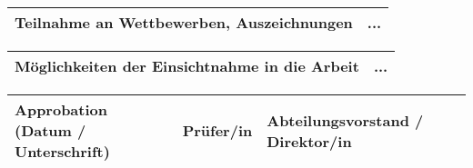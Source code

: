 \vspace{0.5cm}

\begin{tabular}{|p{53mm}|p{110mm}|}
\hline
\vspace{0.05cm}
Teilnahme an \newline Wettbewerben, \newline Auszeichnungen &
\vspace{0.05cm}
...\\ [1.1cm]
\hline
\end{tabular}

\vspace{0.5cm}

\begin{tabular}{|p{53mm}|p{110mm}|}
\hline
\vspace{0.05cm}
M\"oglichkeiten der \newline Einsichtnahme in die \newline Arbeit &
\vspace{0.05cm}
...\\ [0.8cm]
\hline
\end{tabular}

\vspace{0.5cm}

\begin{tabular}{|p{5.3cm}|p{5.28cm}|p{5.29cm}|@{}m{0cm}@{}}
\hline
\vspace{-1.1cm}Approbation \newline (Datum / Unterschrift) & \vspace{-1.1cm} Pr\"ufer/in & \vspace{-1.1cm} Abteilungsvorstand / \newline Direktor/in & \\ [1.9cm]
\hline
\end{tabular}